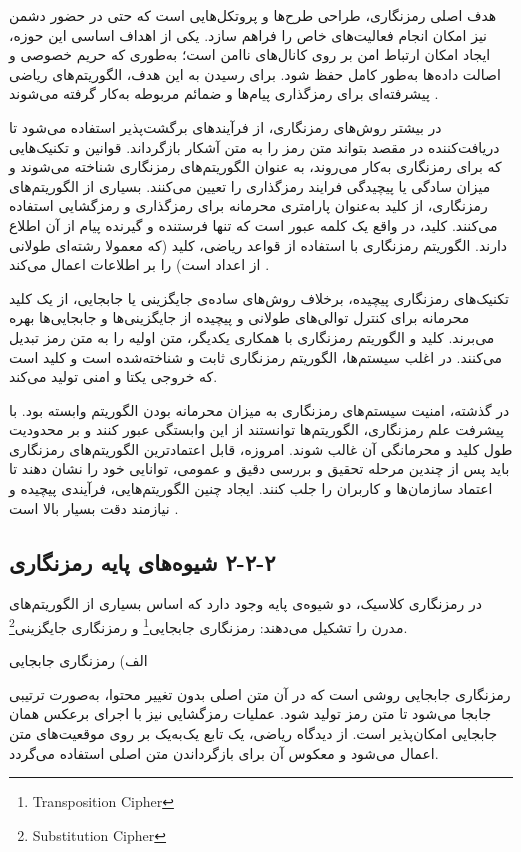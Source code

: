 هدف اصلی رمزنگاری، طراحی طرح‌ها و پروتکل‌هایی است که حتی در حضور دشمن نیز امکان انجام فعالیت‌های خاص را فراهم سازد. یکی از اهداف اساسی این حوزه، ایجاد امکان ارتباط امن بر روی کانال‌های ناامن است؛ به‌طوری که حریم خصوصی و اصالت داده‌ها به‌طور کامل حفظ شود. برای رسیدن به این هدف، الگوریتم‌های ریاضی پیشرفته‌ای برای رمزگذاری پیام‌ها و ضمائم مربوطه به‌کار گرفته می‌شوند \cite{ref18}.

در بیشتر روش‌های رمزنگاری، از فرآیندهای برگشت‌پذیر استفاده می‌شود تا دریافت‌کننده در مقصد بتواند متن رمز را به متن آشکار  بازگرداند. قوانین و تکنیک‌هایی که برای رمزنگاری به‌کار می‌روند، به عنوان الگوریتم‌های رمزنگاری شناخته می‌شوند و میزان سادگی یا پیچیدگی فرایند رمزگذاری را تعیین می‌کنند. بسیاری از الگوریتم‌های رمزنگاری، از کلید  به‌عنوان پارامتری محرمانه برای رمزگذاری و رمزگشایی استفاده می‌کنند. کلید، در واقع یک کلمه عبور است که تنها فرستنده و گیرنده پیام از آن اطلاع دارند. الگوریتم رمزنگاری با استفاده از قواعد ریاضی، کلید (که معمولا رشته‌ای طولانی از اعداد است) را بر اطلاعات اعمال می‌کند \cite{ref19}.

تکنیک‌های رمزنگاری پیچیده، برخلاف روش‌های ساده‌ی جایگزینی یا جابجایی، از یک کلید محرمانه برای کنترل توالی‌های طولانی و پیچیده از جایگزینی‌ها و جابجایی‌ها بهره می‌برند. کلید و الگوریتم رمزنگاری با همکاری یکدیگر، متن اولیه را به متن رمز تبدیل می‌کنند. در اغلب سیستم‌ها، الگوریتم رمزنگاری ثابت و شناخته‌شده است و کلید است که خروجی یکتا و امنی تولید می‌کند\cite{ref20}.

در گذشته، امنیت سیستم‌های رمزنگاری به میزان محرمانه بودن الگوریتم وابسته بود. با پیشرفت علم رمزنگاری، الگوریتم‌ها توانستند از این وابستگی عبور کنند و بر محدودیت طول کلید و محرمانگی آن غالب شوند. امروزه، قابل اعتمادترین الگوریتم‌های رمزنگاری باید پس از چندین مرحله تحقیق و بررسی دقیق و عمومی، توانایی خود را نشان دهند تا اعتماد سازمان‌ها و کاربران را جلب کنند. ایجاد چنین الگوریتم‌هایی، فرآیندی پیچیده و نیازمند دقت بسیار بالا است \cite{ref21}.

\subsection{‏۲‏-‏۲‏-‏۲‏ شیوه‌های پایه رمزنگاری}

در رمزنگاری کلاسیک، دو شیوه‌ی پایه وجود دارد که اساس بسیاری از الگوریتم‌های مدرن را تشکیل می‌دهند: رمزنگاری جابجایی\footnote{Transposition Cipher} و رمزنگاری جایگزینی\footnote{Substitution Cipher}\cite{ref22}.

الف) رمزنگاری جابجایی

رمزنگاری جابجایی روشی است که در آن متن اصلی بدون تغییر محتوا، به‌صورت ترتیبی جابجا می‌شود تا متن رمز تولید شود. عملیات رمزگشایی نیز با اجرای برعکس همان جابجایی امکان‌پذیر است. از دیدگاه ریاضی، یک تابع یک‌به‌یک بر روی موقعیت‌های متن اعمال می‌شود و معکوس آن برای بازگرداندن متن اصلی استفاده می‌گردد.

